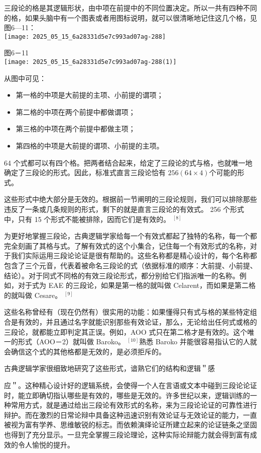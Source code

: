 三段论的格是其逻辑形状，由中项在前提中的不同位置决定。所以一共有四种不同的格，如果头脑中有一个图表或者用图标说明，就可以很清晰地记住这几个格，见图6—11：\\
\texttt{[image: 2025\_05\_15\_6a28331d5e7c993ad07ag-288]}

图6－11\\
\texttt{[image: 2025\_05\_15\_6a28331d5e7c993ad07ag-288(1)]}

从图中可见：

\begin{itemize}
  \item 第一格的中项是大前提的主项、小前提的谓项；
  \item 第二格的中项在两个前提中都做谓项；
  \item 第三格的中项在两个前提中都做主项；
  \item 第四格的中项是大前提的谓项、小前提的主项。
\end{itemize}

64 个式都可以有四个格。把两者结合起来，给定了三段论的式与格，也就唯一地确定了三段论的形式。因此，标准式直言三段论恰有 $256(64 \times 4)$个可能的形式。

这些形式中绝大部分是无效的。根据前一节阐明的三段论规则，我们可以排除那些违反了一条或几条规则的形式，剩下的就是直言三段论的有效式。 256 个形式中，只有 15 个形式不能被排除，因而它们是有效的。 ${ }^{[8]}$

为更好地掌握三段论，古典逻辑学家给每一个有效式都起了独特的名称，每一个都完全刻画了其格与式。了解有效式的这个小集合，记住每一个有效形式的名称，对于我们实际运用三段论论证是很有帮助的。这些名称都是精心设计的，每个名称都包含了三个元音，代表着被命名三段论的式（依据标准的顺序：大前提、小前提、结论）。对于同式不同格的有效三段论形式，都分别给它们指派唯一的名称。例如，对于式为 EAE 的三段论，如果是第一格的就叫做 Celarent，而如果是第二格的就叫做 Cesare。 ${ }^{[9]}$

这些名称曾经有（现在仍然有）很实用的功能：如果懂得只有式与格的某些特定组合是有效的，并且通过名字就能识别那些有效论证，那么，无论给出任何式或格的三段论，就都能立即判定其正误。例如，AOO 式只在第二格才是有效的。这个唯一的形式（AOO－2）就叫做 Baroko。 ${ }^{[10]}$熟悉 Baroko 并能很容易指认它的人就会确信这个式的其他格都是无效的，是必须拒斥的。

古典逻辑学家很细致地研究了这些形式，谙熟它们的结构和逻辑＂感

应＂。这种精心设计好的逻辑系统，会使得一个人在言语或文本中碰到三段论论证时，能立即确切指认哪些是有效的，哪些是无效的。许多世纪以来，逻辑训练的一种常用方式，就是通过给出三段论有效形式的名称，来为三段论论证的可靠性进行辩护。而在激烈的日常论辩中具备这种迅速识别有效论证与无效论证的能力，一直被视为富有学养、思维敏锐的标志。而依赖演绎论证所建立起来的论证链条之坚固也得到了充分显示。一旦完全掌握三段论理论，这种实际论辩能力就会得到富有成效的令人愉悦的提升。

